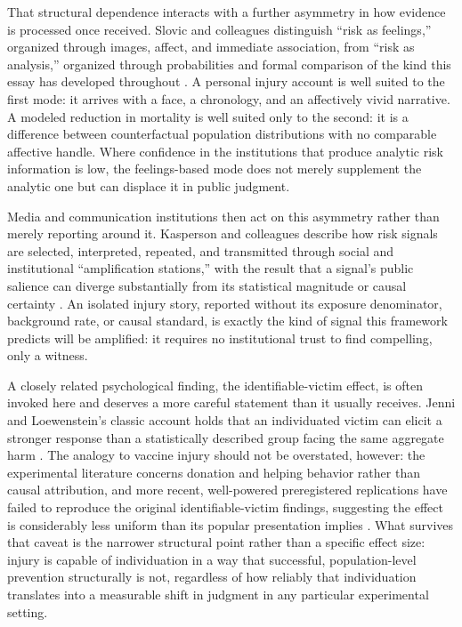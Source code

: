 \documentclass[11pt]{article}
\begin{document}
That structural dependence interacts with a further asymmetry in how evidence is processed once received. Slovic and colleagues distinguish ``risk as feelings,'' organized through images, affect, and immediate association, from ``risk as analysis,'' organized through probabilities and formal comparison of the kind this essay has developed throughout \citep{slovic2004}. A personal injury account is well suited to the first mode: it arrives with a face, a chronology, and an affectively vivid narrative. A modeled reduction in mortality is well suited only to the second: it is a difference between counterfactual population distributions with no comparable affective handle. Where confidence in the institutions that produce analytic risk information is low, the feelings-based mode does not merely supplement the analytic one but can displace it in public judgment.

Media and communication institutions then act on this asymmetry rather than merely reporting around it. Kasperson and colleagues describe how risk signals are selected, interpreted, repeated, and transmitted through social and institutional ``amplification stations,'' with the result that a signal's public salience can diverge substantially from its statistical magnitude or causal certainty \citep{kasperson1988}. An isolated injury story, reported without its exposure denominator, background rate, or causal standard, is exactly the kind of signal this framework predicts will be amplified: it requires no institutional trust to find compelling, only a witness.

A closely related psychological finding, the identifiable-victim effect, is often invoked here and deserves a more careful statement than it usually receives. Jenni and Loewenstein's classic account holds that an individuated victim can elicit a stronger response than a statistically described group facing the same aggregate harm \citep{jenni1997,small2007}. The analogy to vaccine injury should not be overstated, however: the experimental literature concerns donation and helping behavior rather than causal attribution, and more recent, well-powered preregistered replications have failed to reproduce the original identifiable-victim findings, suggesting the effect is considerably less uniform than its popular presentation implies \citep{maier2023}. What survives that caveat is the narrower structural point rather than a specific effect size: injury is capable of individuation in a way that successful, population-level prevention structurally is not, regardless of how reliably that individuation translates into a measurable shift in judgment in any particular experimental setting.
\end{document}
